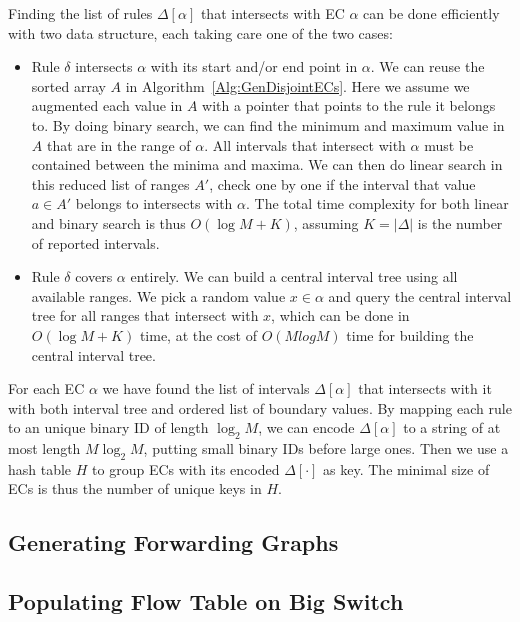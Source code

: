 Finding the list of rules $\Delta[\alpha]$ that intersects with EC $\alpha$ can be done
efficiently with two data structure,
each taking care one of the two cases\cite{FindIntersectionWiki}:
\begin{itemize}
\item Rule $\delta$ intersects $\alpha$ with its start and/or end point in $\alpha$.
        We can reuse the sorted array $A$ in Algorithm~\ref{Alg:GenDisjointECs}.
        Here we assume we augmented each value in $A$ with a pointer that points to
        the rule it belongs to.
        By doing binary search, we can find the minimum and maximum value in $A$ that
        are in the range of $\alpha$.
        All intervals that intersect with $\alpha$ must be contained between
        the minima and maxima.
        We can then do linear search in this reduced list of ranges $A'$,
        check one by one if the interval that value $a\in A'$ belongs to
        intersects with $\alpha$.
        The total time complexity for both linear and binary search is thus $O(\log M + K)$,
        assuming $K=|\Delta|$ is the number of reported intervals.
\item Rule $\delta$ covers $\alpha$ entirely. We can build
        a central interval tree\cite{ComputationalGeometryBook} using all available ranges.
        We pick a random value $x \in \alpha$ and query the central interval tree for
        all ranges that intersect with $x$, which can be done in $O(\log M + K)$ time,
        at the cost of $O(M log M)$ time for building the central interval tree.
        
\end{itemize}

For each EC $\alpha$ we have found the list of intervals $\Delta[\alpha]$
that intersects with it with both interval tree and ordered list of boundary values.
By mapping each rule to an unique binary ID of length $\log_2 M$,
we can encode $\Delta[\alpha]$ to a string of at most length $M\log_2 M$, putting
small binary IDs before large ones.
Then we use a hash table $H$ to group ECs with its encoded $\Delta[\cdot]$ as key.
The minimal size of ECs is thus the number of unique keys in $H$.


\subsection{Generating Forwarding Graphs}

\subsection{Populating Flow Table on Big Switch}




